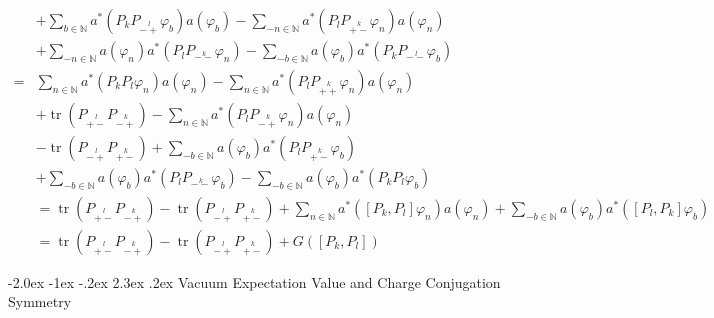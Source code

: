 \documentclass[oneside,reqno,12pt]{amsart}
\makeatletter
\DeclareMathOperator{\tr}{tr}
\renewcommand\section{\@startsection {section}{1}{\z@}%
                                   {-2.0ex \@plus -1ex \@minus -.2ex}%
                                   {2.3ex \@plus.2ex}%
                                   {\normalfont\Large\bfseries}}
\makeatother
\begin{document}
\begin{align*}
&+\sum_{b\in\mathbb{N}}a^*\left(P_k P_{\stackrel{l}{-+}}\varphi_b\right)a(\varphi_b)-\sum_{-n\in\mathbb{N}}a^*\left(P_l P_{\stackrel{k}{+-}}\varphi_n\right) a(\varphi_n)\\
&+\sum_{-n\in\mathbb{N}}a(\varphi_n)a^*\left(P_l P_{\stackrel{k}{--}}\varphi_n\right) - \sum_{-b \in \mathbb{N}} a(\varphi_b)a^*\left(P_k P_{\stackrel{l}{--}}\varphi_b\right)\\
=&\sum_{n\in\mathbb{N}} a^*\left(P_k P_l \varphi_n \right) a(\varphi_n) - \sum_{n\in\mathbb{N}} a^*\left(P_l P_{\stackrel{k}{++}} \varphi_n \right) a(\varphi_n)\\
&+\tr \left( P_{\stackrel{l}{+-}} P_{\stackrel{k}{-+}}\right) - \sum_{n\in\mathbb{N}} a^*\left( P_l P_{\stackrel{k}{-+}} \varphi_n\right)a(\varphi_n)\\
&-\tr \left( P_{\stackrel{l}{-+}} P_{\stackrel{k}{+-}}\right) + \sum_{-b\in\mathbb{N}} a(\varphi_b) a^*\left(P_l P_{\stackrel{k}{+-}} \varphi_b\right)\\
&+\sum_{-b\in\mathbb{N}} a(\varphi_b) a^*\left( P_l P_{\stackrel{k}{--}}\varphi_b\right) - \sum_{-b\in\mathbb{N}} a(\varphi_b) a^*\left( P_k P_l \varphi_b\right)\\
&=\tr \left( P_{\stackrel{l}{+-}} P_{\stackrel{k}{-+}}\right)
-\tr \left( P_{\stackrel{l}{-+}} P_{\stackrel{k}{+-}}\right)
+\sum_{n\in\mathbb{N}} a^*\left(\left[P_k ,P_l\right] \varphi_n \right) a(\varphi_n)
+\sum_{-b\in\mathbb{N}} a(\varphi_b)a^*\left(\left[P_l ,P_k\right] \varphi_b \right) \\
&=\tr \left( P_{\stackrel{l}{+-}} P_{\stackrel{k}{-+}}\right)
-\tr \left( P_{\stackrel{l}{-+}} P_{\stackrel{k}{+-}}\right)
+G\left(\left[P_k,P_l\right]\right)
\end{align*}

\section{Vacuum Expectation Value and Charge Conjugation Symmetry}\label{sec:vac_exp}
\end{document}
